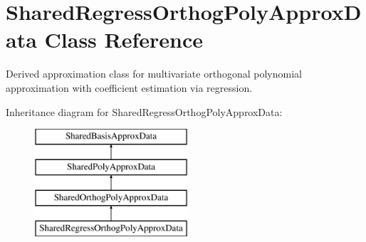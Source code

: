 \section{Shared\+Regress\+Orthog\+Poly\+Approx\+Data Class Reference}
\label{classPecos_1_1SharedRegressOrthogPolyApproxData}


Derived approximation class for multivariate orthogonal polynomial approximation with coefficient estimation via regression.  


Inheritance diagram for Shared\+Regress\+Orthog\+Poly\+Approx\+Data\+:\begin{figure}[H]
\begin{center}
\leavevmode
\includegraphics[height=4.000000cm]{classPecos_1_1SharedRegressOrthogPolyApproxData}
\end{center}
\end{figure}
